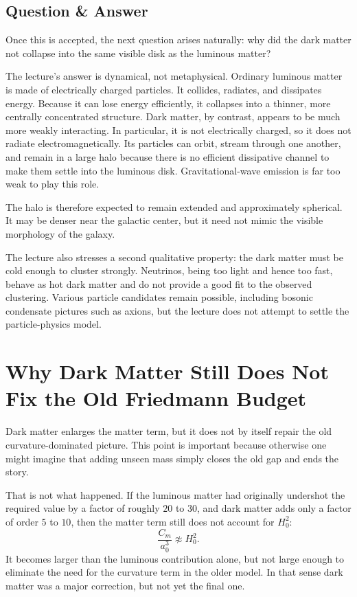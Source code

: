 \subsection{Question \& Answer}

Once this is accepted, the next question arises naturally: why did the dark matter not collapse into the same visible disk as the luminous matter?

The lecture's answer is dynamical, not metaphysical. Ordinary luminous matter is made of electrically charged particles. It collides, radiates, and dissipates energy. Because it can lose energy efficiently, it collapses into a thinner, more centrally concentrated structure. Dark matter, by contrast, appears to be much more weakly interacting. In particular, it is not electrically charged, so it does not radiate electromagnetically. Its particles can orbit, stream through one another, and remain in a large halo because there is no efficient dissipative channel to make them settle into the luminous disk. Gravitational-wave emission is far too weak to play this role.

The halo is therefore expected to remain extended and approximately spherical. It may be denser near the galactic center, but it need not mimic the visible morphology of the galaxy.

The lecture also stresses a second qualitative property: the dark matter must be cold enough to cluster strongly. Neutrinos, being too light and hence too fast, behave as hot dark matter and do not provide a good fit to the observed clustering. Various particle candidates remain possible, including bosonic condensate pictures such as axions, but the lecture does not attempt to settle the particle-physics model.

\section{Why Dark Matter Still Does Not Fix the Old Friedmann Budget}

Dark matter enlarges the matter term, but it does not by itself repair the old curvature-dominated picture. This point is important because otherwise one might imagine that adding unseen mass simply closes the old gap and ends the story.

That is not what happened. If the luminous matter had originally undershot the required value by a factor of roughly \(20\) to \(30\), and dark matter adds only a factor of order \(5\) to \(10\), then the matter term still does not account for \(H_0^2\):
\begin{equation}
\frac{C_m}{a_0^3}\not\approx H_0^2.
\end{equation}
It becomes larger than the luminous contribution alone, but not large enough to eliminate the need for the curvature term in the older model. In that sense dark matter was a major correction, but not yet the final one.

